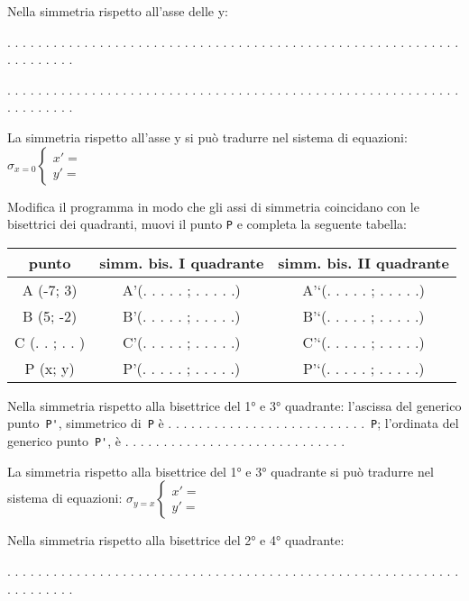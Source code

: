 Nella simmetria rispetto all'asse delle y:

. . . . . . . . . . . . . . . . . . . . . . . . . . . . . . . . . . . . . . . .
. . . . . . . . . . . . . . . . . . . . . . . . . . . .

. . . . . . . . . . . . . . . . . . . . . . . . . . . . . . . . . . . . . . . .
. . . . . . . . . . . . . . . . . . . . . . . . . . . .

La simmetria rispetto all'asse y si può tradurre nel sistema di equazioni:
\(\sigma_{x = 0} \left \{
\begin{array}{l}
x' = {} \\
y' = {}
\end{array} \right .\)

Modifica il programma in modo che gli assi di simmetria coincidano con le
bisettrici dei quadranti, muovi il punto \lstinline{P} e completa la seguente 
tabella:

\begin{tabular}{|c|c|c|}
\hline

punto
 & 
simm. bis. I quadrante
 & 
simm. bis. II quadrante
\\
\hline
A (-7; 3)
 & 
A'(. . . . . ; . . . . .)
 & 
A'`(. . . . . ; . . . . .)
\\
\hline
B (5; -2)
 & 
B'(. . . . . ; . . . . .)
 & 
B'`(. . . . . ; . . . . .)
\\
\hline
C (. . ; . . )
 & 
C'(. . . . . ; . . . . .)
 & 
C'`(. . . . . ; . . . . .)
\\
\hline
P (x; y)
 & 
P'(. . . . . ; . . . . .)
 & 
P'`(. . . . . ; . . . . .)
\\
\hline\end{tabular}


Nella simmetria rispetto alla bisettrice del 1° e 3° quadrante:
l'ascissa del generico punto~\lstinline{P'}, simmetrico di~\lstinline{P}
è . . . . . . . . . . . . . . . . . . . . . . . . . .~\lstinline{P};
l'ordinata del generico punto~\lstinline{P'},
è . . . . . . . . . . . . . . . . . . . . . . . . . . . . .

La simmetria rispetto alla bisettrice del 1° e 3° quadrante si può tradurre
nel sistema di equazioni:
\(\sigma_{y = x} \left \{
\begin{array}{l}
x' = {} \\
y' = {}
\end{array} \right .\)

Nella simmetria rispetto alla bisettrice del 2° e 4° quadrante:

. . . . . . . . . . . . . . . . . . . . . . . . . . . . . . . . . . . . . . . .
. . . . . . . . . . . . . . . . . . . . . . . . . . . .

